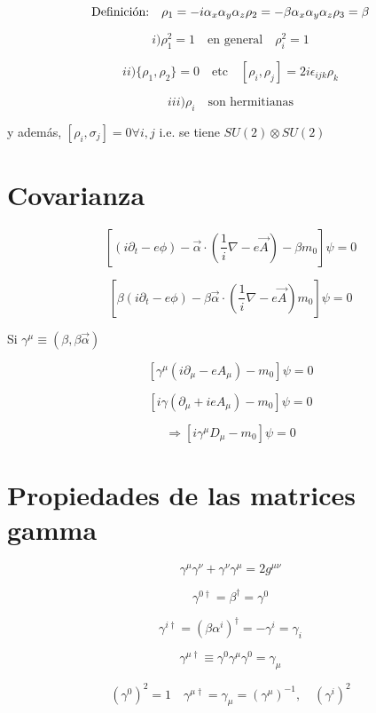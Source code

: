 \documentclass{report}
\begin{document}
\[\text{Definición:} \quad \rho_{1} = - i \alpha_{x} \alpha_{y} \alpha_{z} \\
\rho _{2}= - \beta \alpha_{x} \alpha_{y} \alpha_{z}\\
\rho_{3} = \beta\\ \]

\[i) \rho_{1}^2 = 1 \quad \text{en general} \quad \rho_{i}^2 = 1\]

\[ii)\lbrace \rho_{1},\rho_{2}\rbrace = 0 \quad \text{etc} \quad [\rho_{i} , \rho_{j}] = 2 i \epsilon_{ijk} \rho_{k} \]

\[iii)\rho_{i} \quad \text{son hermitianas} \]

y además, $[\rho_{i}, \sigma_{j}] = 0 \forall i,j $ i.e. se tiene $SU(2) \otimes SU(2)$


\section{Covarianza} 

\[[(i \partial_{t} - e \phi)- \overrightarrow{\alpha} \cdot (\frac{1}{i} \nabla -e \overrightarrow{A})-\beta m_{0}] \psi = 0\]

\[[\beta(i \partial_{t} - e \phi)-\beta \overrightarrow{\alpha} \cdot (\frac{1}{i} \nabla - e \overrightarrow{A})m_{0}] \psi = 0\]

Si $\gamma^{\mu} \equiv (\beta , \beta \overrightarrow{\alpha})$

\[[\gamma ^{\mu} (i \partial_{\mu} - e A_{\mu}) - m_{0}] \psi = 0\]

\[[ i \gamma (\partial_{\mu} + i e A_{\mu}) - m_{0}] \psi = 0 \]

\[\Rightarrow [i \gamma^{\mu} D_{\mu} - m_{0}]\psi = 0\]

\section{Propiedades de las matrices gamma}

\begin{equation}
\gamma^{\mu} \gamma ^{\nu} + \gamma ^{\nu} \gamma ^{\mu}= 2 g^{\mu \nu}
\end{equation}

\[\gamma^{0\dagger} = \beta^{\dagger} = \gamma^{0}\]

\[\gamma^{i \dagger} = (\beta \alpha^i)^{\dagger} = - \gamma^{i} = \gamma_{i}\]

\[\gamma^{\mu \dagger} \equiv \gamma^0 \gamma ^{\mu} \gamma ^0 = \gamma _{\mu}\]

\[(\gamma^{0})^2 = 1 \quad \gamma^{\mu \dagger} = \gamma_{\mu} = (\gamma ^{\mu})^{-1}, \quad (\gamma ^i)^2\]
\end{document}
